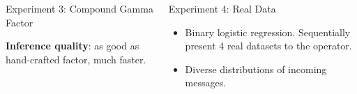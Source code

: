 \documentclass[english]{beamer}
\begin{document}
\begin{frame}
\begin{columns}[t]
\begin{block}{ Experiment 3: Compound Gamma Factor }
\begin{figure}[ht]
{  %
  }
  \label{fig:cg_performance}
\end{figure}

\vspace{5mm}

\textbf{Inference quality}: as good as hand-crafted factor, much faster.
\end{block}

\begin{block}{ Experiment 4: Real Data}
\begin{itemize}
    \item Binary logistic regression.  Sequentially present 4 real datasets
        to the operator.
    \item Diverse distributions of incoming messages.
\end{itemize}


\end{block}
\end{columns}
\end{frame}
\end{document}

